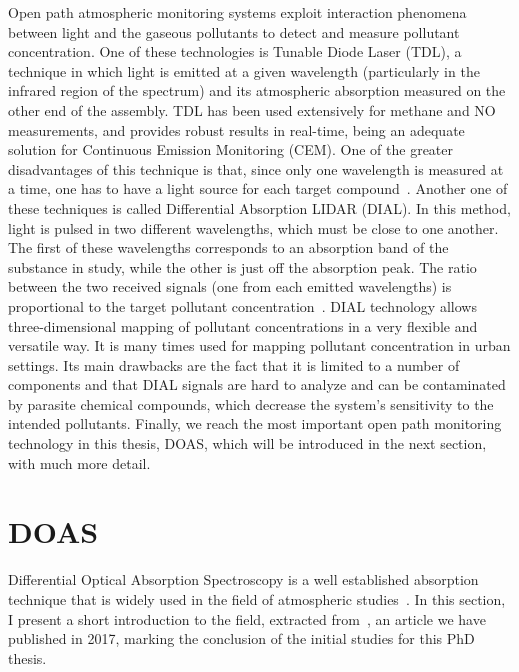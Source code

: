 Open path atmospheric monitoring systems exploit interaction phenomena
between light and the gaseous pollutants to detect and measure pollutant
concentration. One of these technologies is Tunable Diode Laser
(\gls{TDL}), a technique in which light is emitted at a given wavelength
(particularly in the infrared region of the spectrum) and its
atmospheric absorption measured on the other end of the assembly.
\gls{TDL} has been used extensively for methane and NO measurements, and
provides robust results in real-time, being an adequate solution for
Continuous Emission Monitoring (\gls{CEM}). One of the greater
disadvantages of this technique is that, since only one wavelength is
measured at a time, one has to have a light source for each target
compound~\cite{Vallero2014, Bishop1996}. Another one of these techniques
is called Differential Absorption LIDAR (\gls{DIAL}). In this method,
light is pulsed in two different wavelengths, which must be close to one
another. The first of these wavelengths corresponds to an absorption
band of the substance in study, while the other is just off the
absorption peak. The ratio between the two received signals (one from
each emitted wavelengths) is proportional to the target pollutant
concentration~\cite{Stewart1996}. \gls{DIAL} technology allows
three-dimensional mapping of pollutant concentrations in a very flexible
and versatile way. It is many times used for mapping pollutant
concentration in urban settings. Its main drawbacks are the fact that it
is limited to a number of components and that \gls{DIAL} signals are
hard to analyze and can be contaminated by parasite chemical compounds,
which decrease the system's sensitivity to the intended pollutants.
Finally, we reach the most important open path monitoring technology in
this thesis, DOAS, which will be introduced in the next section, with
much more detail.

\section{DOAS}%
\label{sec:doas}

Differential Optical Absorption Spectroscopy is a well established
absorption technique that is widely used in the field of atmospheric
studies~\cite{Platt2007}. In this section, I present a short
introduction to the field, extracted from~\cite{ValentedeAlmeida2017},
an article we have published in 2017, marking the conclusion of the
initial studies for this PhD thesis.

